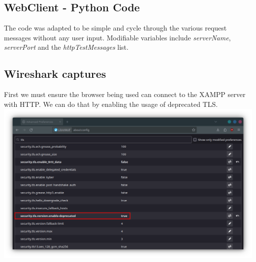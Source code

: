 \documentclass[11pt,a4paper]{report}
\begin{document}
    \subsection{WebClient - Python Code}
        \lstset{style=pythoncode}
        
        The code was adapted to be simple and cycle through the various request messages without any user input.
        Modifiable variables include \textit{serverName}, \textit{serverPort} and the \textit{httpTestMessages} list.

    
    \subsection{Wireshark captures}
        First we must ensure the browser being used can connect to the XAMPP server with HTTP. We can do that by enabling the usage of deprecated TLS.
        \includegraphics[scale=0.3]{librewolf_tls} 
\end{document}
